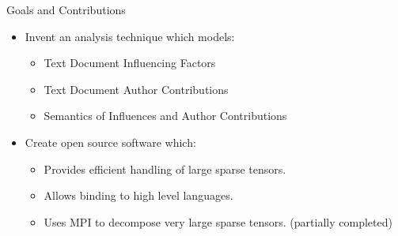 \documentclass[handout]{beamer}
\begin{document}
\begin{frame}{Goals and Contributions}
  \begin{itemize}[<+->]
  \item Invent an analysis technique which models:
    \begin{itemize}
    \item Text Document Influencing Factors
    \item Text Document Author Contributions
    \item Semantics of Influences and Author Contributions
    \end{itemize}
  \item Create open source software which:
    \begin{itemize}
    \item Provides efficient handling of large sparse tensors.
    \item Allows binding to high level languages.
    \item Uses MPI to decompose very large sparse tensors. (partially
      completed)
    \end{itemize}
  \end{itemize}
\end{frame}
\end{document}
